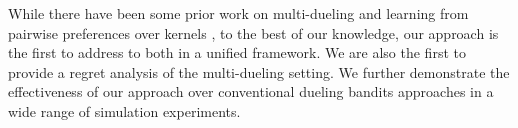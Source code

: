 While there have been some prior work on multi-dueling \citep{brost2016multi} and learning from pairwise preferences over kernels \citep{gonzalez2016bayesian}, to the best of our knowledge, our approach is the first to address to both in a unified framework.  We are also the first to provide a regret analysis of the multi-dueling setting.  We further demonstrate the effectiveness of our approach over conventional dueling bandits approaches in a wide range of simulation experiments.





